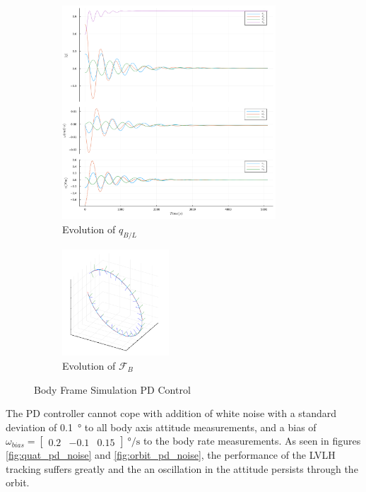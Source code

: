 \documentclass{article}
\begin{document}
\begin{figure}[H]
\centering
	\begin{subfigure}[b]{0.6\textwidth}
		\centering
		\includegraphics[width=8cm]{images/pd_perfect_attitude_lvlh.png}
		\caption{Evolution of $q_{B/L}$}
		\label{fig:quat_pd_perfect}
	\end{subfigure}
	\begin{subfigure}[b]{0.3\textwidth}
		\centering
		\includegraphics[width=4cm]{images/pd_perfect_orbit_0s_to_5100s.png}
		\caption{Evolution of $\mathcal{F}_{B}$}
		\label{fig:orbit_pd_perfect}
	\end{subfigure}
	\caption{Body Frame Simulation PD Control}
\end{figure}

The PD controller cannot cope with addition of white noise with a standard deviation of \SI{0.1}{\degree} to all body axis attitude measurements, and a bias of $\omega_{bias} = [\begin{matrix} 0.2 & -0.1 & 0.15\end{matrix}] \SI{}{\degree/\second}$ to the body rate measurements. As seen in figures \ref{fig:quat_pd_noise} and \ref{fig:orbit_pd_noise}, the performance of the LVLH tracking suffers greatly and the an oscillation in the attitude persists through the orbit.
\end{document}
